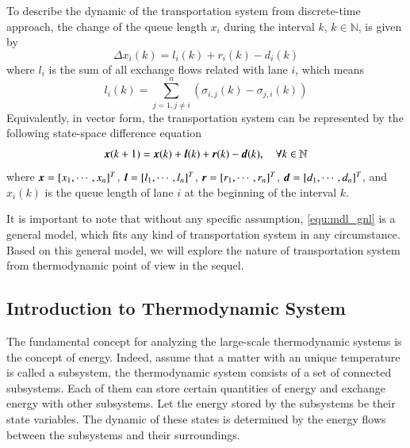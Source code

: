 \documentclass[preprint,authoryear,12pt]{elsarticle}
\renewcommand{\vec}[1]{\mbox{\boldmath$#1$}}
\begin{document}
To describe the dynamic of the transportation system from discrete-time approach, the change of the queue length $x_i$ during the interval $k$, $k\in\mathbb{N}$, is given by
\begin{equation}\label{equ:mdl_gnl_lane}
\Delta x_i(k) = l_i(k)+r_i(k)-d_i(k)
\end{equation}
where $l_i$ is the sum of all exchange flows related with lane $i$, which means
\begin{equation}\label{equ:exchange_vehicle}
 l_i(k)=\sum_{j=1,j\neq i}^{n}(\sigma_{i,j}(k)-\sigma_{j,i}(k))
\end{equation}
Equivalently, in vector form, the transportation system can be represented by the following state-space difference equation
\begin{equation}\label{equ:mdl_gnl}
\vec{x}(k+1)=\vec{x}(k)+\vec{l}(k)+\vec{r}(k)-\vec{d}(k),\quad \forall k\in\mathbb{N}
\end{equation}
where $\vec{x}=[x_1,\cdots,x_n]^T$, $\vec{l}=[l_1,\cdots,l_n]^T$, $\vec{r}=[r_1,\cdots,r_n]^T$, $\vec{d}=[d_1,\cdots,d_n]^T$, and $x_i(k)$ is the queue length of lane $i$ at the beginning of the interval $k$.

It is important to note that without any specific assumption, \eqref{equ:mdl_gnl} is a general model, which fits any kind of transportation system in any circumstance. Based on this general model, we will explore the nature of transportation system from thermodynamic point of view in the sequel.

\subsection{Introduction to Thermodynamic System}

The fundamental concept for analyzing the large-scale thermodynamic systems is the concept of energy. Indeed, assume that a matter with an unique temperature is called a subsystem, the thermodynamic system consists of a set of connected subsystems. Each of them can store certain quantities of energy and exchange energy with other subsystems.
Let the energy stored by the subsystems be their state variables. The dynamic of these states is determined by the energy flows between the subsystems and their surroundings.
\end{document}
